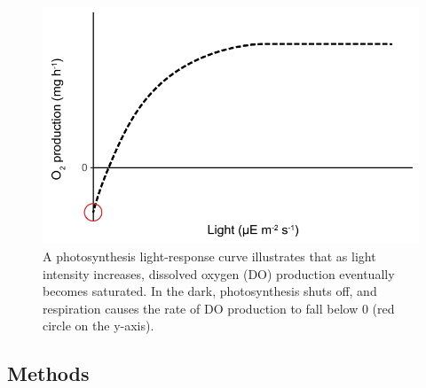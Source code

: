 \documentclass[11pt,]{article}
\begin{document}
\begin{figure}
\centering
\includegraphics{../_chapter_materials/light_response_curve.pdf}
\caption{A photosynthesis light-response curve illustrates that as light
intensity increases, dissolved oxygen (DO) production eventually becomes
saturated. In the dark, photosynthesis shuts off, and respiration causes
the rate of DO production to fall below 0 (red circle on the y-axis).}
\end{figure}

\subsection{Methods}\label{methods}
\end{document}
